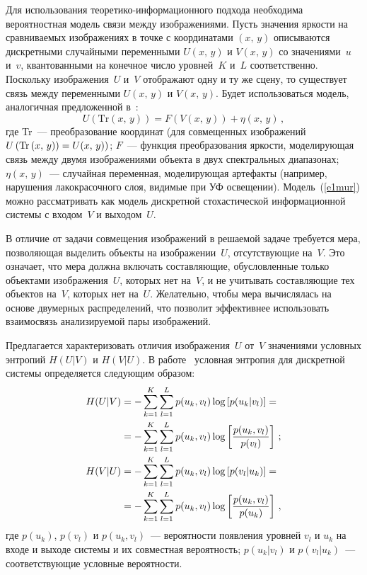 \begin{multicols}{2}
  Для использования теоретико-ин\-фор\-ма\-ци\-он\-но\-го подхода необходима 
вероятностная модель свя\-зи между изображениями. Пусть значения яр\-кости на 
сравниваемых изображениях в точке с координатами $(x,\,y)$ описываются дискретными 
случай\-ны\-ми переменными $U(x,\,y)$ и $V(x,\,y)$ со значениями~$u$ и~$v$, квантованными 
на конечное число уровней~$K$ и~$L$ соответственно. Поскольку изоб\-ра\-же\-ния~$U$ и~$V$ 
отображают одну и ту же сцену, то существует связь между переменными $U(x,\,y)$ и 
$V(x,\,y)$. Будет использоваться модель, аналогичная предложенной в~\cite{11mur}:
  \begin{equation}
  U\left(\mathrm{Tr}\left(x,\,y\right)\right) =F(V(x,\,y))+\eta(x,\,y)\,,
  \label{e1mur}
  \end{equation}
где Tr~--- преобразование координат (для совмещенных изображений 
$U\left(\mathrm{Tr}\left(x,\,y\right)\right)\hm=U(x,\,y))$; $F$~--- функция преобразования яркости, моделирующая связь 
между двумя изображениями объекта в двух спектральных диапазонах; $\eta(x,\,y)$~--- 
случайная переменная, моделирующая артефакты (например, нарушения лакокрасочного 
слоя, видимые при УФ освещении). Модель~(\ref{e1mur}) можно 
рассматривать как модель дискретной стохастической информационной системы с 
входом~$V$ и выходом~$U$. 
  
  В отличие от задачи совмещения изображений в решаемой задаче требуется мера, 
позволяющая выделить объекты на изображении~$U$, от\-сут\-ст\-ву\-ющие на~$V$. Это 
означает, что мера должна включать составляющие, обусловленные только объектами 
изображения~$U$, которых нет на~$V$, и не учитывать составляющие тех объектов на~$V$, 
которых нет на~$U$. Желательно, чтобы мера вычислялась на основе двумерных 
распределений, что позволит эффективнее использовать взаимосвязь анализируемой пары 
изображений.
  
  Предлагается характеризовать отличия изображения~$U$ от~$V$ значениями условных 
энтропий $H(U\vert V)$ и $H(V\vert U)$. В работе~\cite{14mur} условная энтропия 
для дискретной системы определяется следующим образом:
  \begin{align}
  H(U\vert V) &= -\sum\limits_{k=1}^K \sum\limits_{l=1}^L p(u_k,v_l)\log \left[ p(u_k\vert 
v_l)\right] ={}\notag\\
&{}=-\sum\limits_{k=1}^K \sum\limits_{l=1}^L p(u_k,v_l)\log 
\left[\displaystyle\frac{\displaystyle p(u_k,v_l)\mathstrut}{\displaystyle p(v_l)\mathstrut}\right]\,;\label{e2mur}\\
  H(V\vert U) &= -\sum\limits_{k=1}^K \sum\limits_{l=1}^L p(u_k,v_l)\log \left[ p(v_l\vert 
u_k)\right] ={}\notag\\
&{}=-\sum\limits_{k=1}^K \sum\limits_{l=1}^L p(u_k,v_l)\log 
\left[\displaystyle\frac{\displaystyle p(u_k,v_l)\mathstrut}{\displaystyle p(u_k)\mathstrut}\right]\,,\label{e3mur}
  \end{align}
где $p(u_k)$, $p(v_l)$ и $p(u_k,v_l)$~--- вероятности появления уровней $v_l$ и $u_k$ на 
входе и выходе системы и их совместная вероятность; $p(u_k\vert v_l)$ и 
$p(v_l\vert u_k)$~--- соответствующие 
условные вероятности.
  

\end{multicols}
